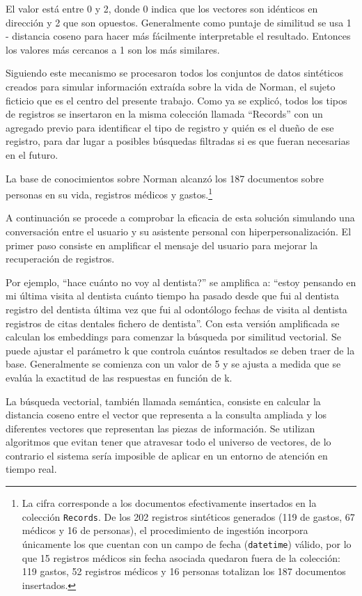 El valor está entre 0 y 2, donde 0 indica que los vectores son idénticos en dirección y 2 que son opuestos. Generalmente como puntaje de similitud se usa 1 - distancia coseno para hacer más fácilmente interpretable el resultado. Entonces los valores más cercanos a 1 son los más similares.

Siguiendo este mecanismo se procesaron todos los conjuntos de datos sintéticos creados para simular información extraída sobre la vida de Norman, el sujeto ficticio que es el centro del presente trabajo. Como ya se explicó, todos los tipos de registros se insertaron en la misma colección llamada ``Records'' con un agregado previo para identificar el tipo de registro y quién es el dueño de ese registro, para dar lugar a posibles búsquedas filtradas si es que fueran necesarias en el futuro.

La base de conocimientos sobre Norman alcanzó los 187 documentos sobre personas en su vida, registros médicos y gastos.\footnote{La cifra corresponde a los documentos efectivamente insertados en la colección \texttt{Records}. De los 202 registros sintéticos generados (119 de gastos, 67 médicos y 16 de personas), el procedimiento de ingestión incorpora únicamente los que cuentan con un campo de fecha (\texttt{datetime}) válido, por lo que 15 registros médicos sin fecha asociada quedaron fuera de la colección: 119 gastos, 52 registros médicos y 16 personas totalizan los 187 documentos insertados.}

A continuación se procede a comprobar la eficacia de esta solución simulando una conversación entre el usuario y su asistente personal con hiperpersonalización. El primer paso consiste en amplificar el mensaje del usuario para mejorar la recuperación de registros.

Por ejemplo, ``hace cuánto no voy al dentista?'' se amplifica a: ``estoy pensando en mi última visita al dentista cuánto tiempo ha pasado desde que fui al dentista registro del dentista última vez que fui al odontólogo fechas de visita al dentista registros de citas dentales fichero de dentista''. Con esta versión amplificada se calculan los embeddings para comenzar la búsqueda por similitud vectorial. Se puede ajustar el parámetro k que controla cuántos resultados se deben traer de la base. Generalmente se comienza con un valor de 5 y se ajusta a medida que se evalúa la exactitud de las respuestas en función de k.

La búsqueda vectorial, también llamada semántica, consiste en calcular la distancia coseno entre el vector que representa a la consulta ampliada y los diferentes vectores que representan las piezas de información. Se utilizan algoritmos que evitan tener que atravesar todo el universo de vectores, de lo contrario el sistema sería imposible de aplicar en un entorno de atención en tiempo real.

